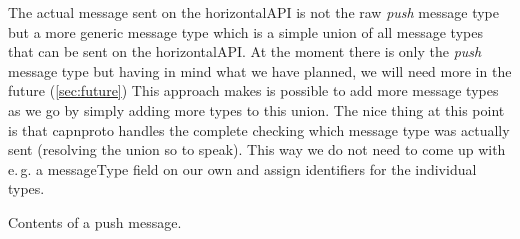 \documentclass[a4paper,english,10pt,NET]{tumarticle}
\renewcommand{\eg}{\mbox{e.\,g.}\xspace} %
\begin{document}
The actual message sent on the horizontalAPI is not the raw \emph{push} message type but a more generic message type which is a simple union of all message types that can be sent on the horizontalAPI.
At the moment there is only the \emph{push} message type but having in mind what we have planned, we will need more in the future (\cref{sec:future})
This approach makes is possible to add more message types as we go by simply adding more types to this union.
The nice thing at this point is that capnproto handles the complete checking which message type was actually sent (resolving the union so to speak).
This way we do not need to come up with \eg a messageType field on our own and assign identifiers for the individual types.

\begin{table}
	\centering
	
	\caption{Contents of a push message.}
	\label{tab:push}
\end{table}
\end{document}
